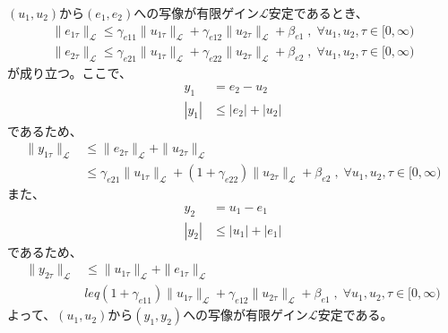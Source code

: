 \documentclass{jsarticle}
\begin{document}
$(u_1,u_2)$から$(e_1,e_2)$への写像が有限ゲイン$\mathcal L$安定であるとき、
\begin{align}
  \|e_{1\tau}\|_\mathcal L \leq \gamma_{e11} \|u_{1\tau}\|_\mathcal L + \gamma_{e12} \|u_{2\tau}\|_\mathcal L + \beta_{e1} \;,\;\forall u_1,u_2 , \tau\in [0,\infty)\\
  \|e_{2\tau}\|_\mathcal L \leq \gamma_{e21} \|u_{1\tau}\|_\mathcal L + \gamma_{e22} \|u_{2\tau}\|_\mathcal L + \beta_{e2} \;,\;\forall u_1,u_2 , \tau\in [0,\infty)
\end{align}
が成り立つ。ここで、
\begin{align*}
  y_1 &= e_2-u_2\\
  |y_1| &\leq |e_2|+|u_2|
\end{align*}
であるため、
\begin{align*}
  \|y_{1\tau}\|_\mathcal L &\leq  \|e_{2\tau}\|_\mathcal L +  \|u_{2\tau}\|_\mathcal L \\
  & \leq \gamma_{e21} \|u_{1\tau}\|_\mathcal L + (1+\gamma_{e22}) \|u_{2\tau}\|_\mathcal L + \beta_{e2} \;,\;\forall u_1,u_2 , \tau\in [0,\infty)
\end{align*}
また、
\begin{align*}
  y_2 &= u_1-e_1\\
  |y_2| & \leq  |u_1| + |e_1|
\end{align*}
であるため、
\begin{align*}
  \|y_{2\tau}\|_\mathcal L &\leq  \|u_{1\tau}\|_\mathcal L +  \|e_{1\tau}\|_\mathcal L \\
  & leq (1+\gamma_{e11}) \|u_{1\tau}\|_\mathcal L + \gamma_{e12} \|u_{2\tau}\|_\mathcal L + \beta_{e1} \;,\;\forall u_1,u_2 , \tau\in [0,\infty)
\end{align*}
よって、$(u_1,u_2)$から$(y_1,y_2)$への写像が有限ゲイン$\mathcal L$安定である。
\end{document}
